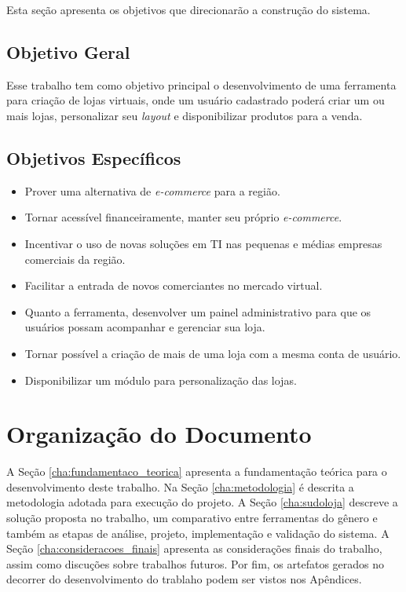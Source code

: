 \documentclass[a4paper,12pt]{monografia}
\begin{document}
Esta seção apresenta os objetivos que direcionarão a construção do sistema.

\subsection{Objetivo Geral} %
\label{sub:objetivo_geral}

Esse trabalho tem como objetivo principal o desenvolvimento de uma ferramenta para criação de lojas virtuais, onde um usuário cadastrado poderá criar um ou mais lojas, personalizar seu \textit{layout} e disponibilizar produtos para a venda.


\subsection{Objetivos Específicos} %
\label{sub:objetivos_espec}

\begin{itemize}
\item Prover uma alternativa de \textit{e-commerce} para a região.
\item Tornar acessível financeiramente, manter seu próprio \textit{e-commerce}.
\item Incentivar o uso de novas soluções em TI nas pequenas e médias empresas comerciais da região.
\item Facilitar a entrada de novos comerciantes no mercado virtual.
\item Quanto a ferramenta, desenvolver um painel administrativo para que os usuários possam acompanhar e gerenciar sua loja.
\item Tornar possível a criação de mais de uma loja com a mesma conta de usuário.
\item Disponibilizar um módulo para personalização das lojas.
\end{itemize}


\section{Organização do Documento} %
\label{sec:organizacao_do_documento}

A Seção \ref{cha:fundamentaco_teorica} apresenta a fundamentação teórica para o desenvolvimento deste trabalho. Na Seção \ref{cha:metodologia} é descrita a metodologia adotada para execução do projeto. A Seção \ref{cha:sudoloja} descreve a solução proposta no trabalho, um comparativo entre ferramentas do gênero e também as etapas de análise, projeto, implementação e validação do sistema. A Seção \ref{cha:consideracoes_finais} apresenta as considerações finais do trabalho, assim como discuções sobre trabalhos futuros. Por fim, os artefatos gerados no decorrer do desenvolvimento do trablaho podem ser vistos nos Apêndices.
\end{document}
